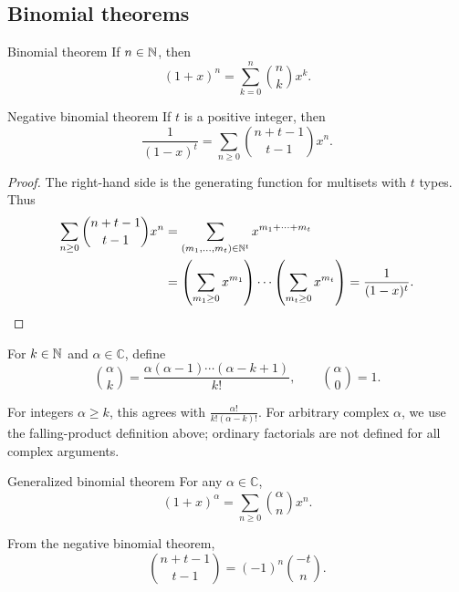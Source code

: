 \subsection{Binomial theorems}
\begin{theorem}{Binomial theorem}
If $n\in\mathbb{N}$, then
\[
(1+x)^n=\sum_{k=0}^n\binom{n}{k}x^k.
\]
\end{theorem}
\begin{theorem}{Negative binomial theorem}
If $t$ is a positive integer, then
\[
\frac1{(1-x)^t}=\sum_{n\ge0}\binom{n+t-1}{t-1}x^n.
\]
\end{theorem}
\begin{proof}
The right-hand side is the generating function for multisets with $t$ types. Thus
\begin{align*}
\sum_{n\ge0}\binom{n+t-1}{t-1}x^n
&=\sum_{(m_1,\ldots,m_t)\in\mathbb{N}^t}x^{m_1+\cdots+m_t}\\
&=\left(\sum_{m_1\ge0}x^{m_1}\right)\cdots
\left(\sum_{m_t\ge0}x^{m_t}\right)
=\frac1{(1-x)^t}.
\end{align*}
\end{proof}
\begin{definition}
For $k\in\mathbb{N}$ and $\alpha\in\mathbb C$, define
\[
\binom{\alpha}{k}=\frac{\alpha(\alpha-1)\cdots(\alpha-k+1)}{k!},
\qquad \binom{\alpha}{0}=1.
\]
\end{definition}
\begin{remark}
For integers $\alpha\ge k$, this agrees with $\displaystyle\frac{\alpha!}{k!(\alpha-k)!}$. For arbitrary complex $\alpha$, we use the falling-product definition above; ordinary factorials are not defined for all complex arguments.
\end{remark}
\begin{theorem}{Generalized binomial theorem}
For any $\alpha\in\mathbb C$,
\[
(1+x)^\alpha=\sum_{n\ge0}\binom{\alpha}{n}x^n.
\]
\end{theorem}
From the negative binomial theorem,
\[
\binom{n+t-1}{t-1}=(-1)^n\binom{-t}{n}.
\]

